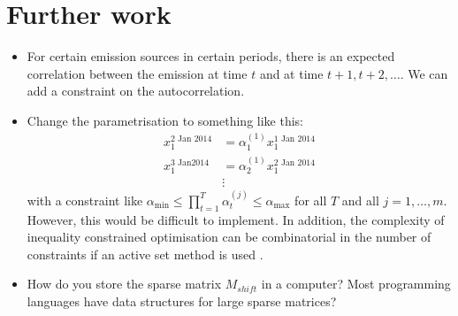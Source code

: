 \documentclass{article}
\begin{document}
\section{Further work}
\begin{itemize}
    \item For certain emission sources in certain periods, there is an expected correlation between the emission at time $t$ and at time $t + 1, t + 2, \dots$. We can add a constraint on the autocorrelation.
    \item Change the parametrisation to something like this: 
    \begin{align*}
        x_1^{2 \text{ Jan } 2014} &= \alpha_1^{(1)} x_1^{1 \text{ Jan } 2014} \\
        x_1^{3 \text{ Jan} 2014} &= \alpha_2^{(1)} x_1^{2 \text{ Jan } 2014} \\
        &\vdots
    \end{align*}
    with a constraint like $\alpha_{\min} \le \prod_{t=1}^T \alpha_t^{(j)} \le \alpha_{\max}$ for all $T$ and all $j = 1,\dots,m$. However, this would be difficult to implement. In addition, the complexity of inequality constrained optimisation can be combinatorial in the number of constraints if an active set method is used \cite{Nocedal2006}.

    \item How do you store the sparse matrix $M_{shift}$ in a computer? Most programming languages have data structures for large sparse matrices?
\end{itemize}

\printbibliography
\end{document}

